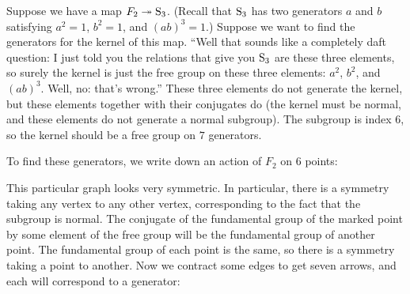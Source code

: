 \documentclass[11pt, oneside]{amsart}
\begin{document}
Suppose we have a map $F_2\twoheadrightarrow \operatorname{S}_3$. (Recall that $\operatorname{S}_3$ has two generators $a$ and $b$ satisfying $a^2=1$, $b^2=1$, and $(ab)^3 = 1$.) Suppose we want to find the generators for the kernel of this map. ``Well that sounds like a completely daft question: I just told you the relations that give you $\operatorname{S}_3$ are these three elements, so surely the kernel is just the free group on these three elements: $a^2$, $b^2$, and $(ab)^3$. Well, no: that's wrong.'' These three elements do not generate the kernel, but these elements together with their conjugates do (the kernel must be normal, and these elements do not generate a normal subgroup). The subgroup is index $6$, so the kernel should be a free group on $7$ generators. 

To find these generators, we write down an action of $F_2$ on $6$ points:
\begin{center}
\end{center}
This particular graph looks very symmetric. In particular, there is a symmetry taking any vertex to any other vertex, corresponding to the fact that the subgroup is normal. The conjugate of the fundamental group of the marked point by some element of the free group will be the fundamental group of another point. The fundamental group of each point is the same, so there is a symmetry taking a point to another.  Now we contract some edges to get seven arrows, and each will correspond to a generator:
\end{document}
